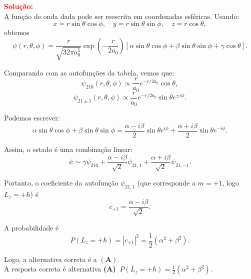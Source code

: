 \documentclass[a4paper,12pt]{article}
\begin{document}
\begin{flushleft}
\vspace{0.5cm}

\textcolor{red}{\textbf{Solução:}}\\

A função de onda dada pode ser reescrita em coordenadas esféricas. Usando:
\[
x = r \sin\theta \cos\phi, \quad y = r \sin\theta \sin\phi, \quad z = r \cos\theta,
\]
obtemos
\[
\psi(r,\theta,\phi) = \frac{r}{\sqrt{32 \pi a_0^5}} \exp\left(-\frac{r}{2a_0}\right)\left[\alpha \sin\theta\cos\phi + \beta \sin\theta\sin\phi + \gamma \cos\theta\right].
\]

Comparando com as autofunções da tabela, vemos que:
\[
\psi_{210}(r,\theta,\phi)\propto \frac{r}{a_0}e^{-r/2a_0}\cos\theta,
\]
\[
\psi_{21\pm1}(r,\theta,\phi)\propto \frac{r}{a_0}e^{-r/2a_0}\sin\theta e^{\pm i\phi}.
\]

Podemos escrever:
\[
\alpha \sin\theta \cos\phi + \beta \sin\theta \sin\phi = 
\frac{\alpha - i\beta}{2} \sin\theta e^{i\phi} + \frac{\alpha+i\beta}{2}\sin\theta e^{-i\phi}.
\]

Assim, o estado é uma combinação linear:
\[
\psi \sim \gamma \psi_{210} + \frac{\alpha - i\beta}{\sqrt{2}} \psi_{21,1} + \frac{\alpha+i\beta}{\sqrt{2}} \psi_{21,-1}.
\]

Portanto, o coeficiente da autofunção \(\psi_{21,1}\) (que corresponde a \(m=+1\), logo \(L_z=+\hbar\)) é
\[
c_{+1} = \frac{\alpha - i\beta}{\sqrt{2}}.
\]

A probabilidade é
\[
P(L_z=+\hbar) = |c_{+1}|^2 = \frac{1}{2}(\alpha^2+\beta^2).
\]

Logo, a alternativa correta é a \(\mathbf{(A)}\).\\

A resposta correta é alternativa \colorbox{green!50}{\textbf{(A) \(\, P(L_z=+\hbar)=\tfrac{1}{2}(\alpha^2+\beta^2)\)}}.
\end{flushleft}



\newpage 
\end{document}
